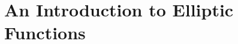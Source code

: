 \documentclass[../../main.tex]{subfiles}
\begin{document}
\chapter{An Introduction to Elliptic Functions}
\end{document}
